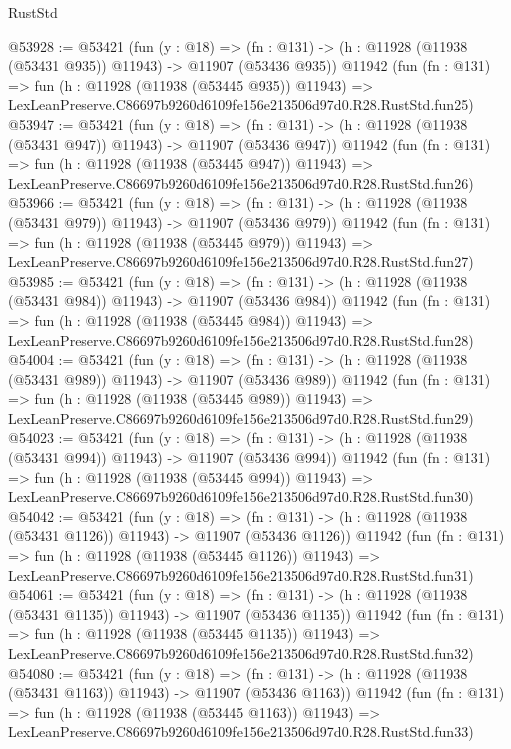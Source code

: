 \begin{lexlean}{RustStd}
\begin{coremodule}
@53928 := @53421
    (fun (y : @18) =>
    (fn : @131) -> (h : @11928 (@11938 (@53431 @935)) @11943) -> @11907 (@53436 @935))
    @11942
    (fun (fn : @131) =>
    fun (h : @11928 (@11938 (@53445 @935)) @11943) =>
    LexLeanPreserve.C86697b9260d6109fe156e213506d97d0.R28.RustStd.fun25)
@53947 := @53421
    (fun (y : @18) =>
    (fn : @131) -> (h : @11928 (@11938 (@53431 @947)) @11943) -> @11907 (@53436 @947))
    @11942
    (fun (fn : @131) =>
    fun (h : @11928 (@11938 (@53445 @947)) @11943) =>
    LexLeanPreserve.C86697b9260d6109fe156e213506d97d0.R28.RustStd.fun26)
@53966 := @53421
    (fun (y : @18) =>
    (fn : @131) -> (h : @11928 (@11938 (@53431 @979)) @11943) -> @11907 (@53436 @979))
    @11942
    (fun (fn : @131) =>
    fun (h : @11928 (@11938 (@53445 @979)) @11943) =>
    LexLeanPreserve.C86697b9260d6109fe156e213506d97d0.R28.RustStd.fun27)
@53985 := @53421
    (fun (y : @18) =>
    (fn : @131) -> (h : @11928 (@11938 (@53431 @984)) @11943) -> @11907 (@53436 @984))
    @11942
    (fun (fn : @131) =>
    fun (h : @11928 (@11938 (@53445 @984)) @11943) =>
    LexLeanPreserve.C86697b9260d6109fe156e213506d97d0.R28.RustStd.fun28)
@54004 := @53421
    (fun (y : @18) =>
    (fn : @131) -> (h : @11928 (@11938 (@53431 @989)) @11943) -> @11907 (@53436 @989))
    @11942
    (fun (fn : @131) =>
    fun (h : @11928 (@11938 (@53445 @989)) @11943) =>
    LexLeanPreserve.C86697b9260d6109fe156e213506d97d0.R28.RustStd.fun29)
@54023 := @53421
    (fun (y : @18) =>
    (fn : @131) -> (h : @11928 (@11938 (@53431 @994)) @11943) -> @11907 (@53436 @994))
    @11942
    (fun (fn : @131) =>
    fun (h : @11928 (@11938 (@53445 @994)) @11943) =>
    LexLeanPreserve.C86697b9260d6109fe156e213506d97d0.R28.RustStd.fun30)
@54042 := @53421
    (fun (y : @18) =>
    (fn : @131) -> (h : @11928 (@11938 (@53431 @1126)) @11943) -> @11907 (@53436 @1126))
    @11942
    (fun (fn : @131) =>
    fun (h : @11928 (@11938 (@53445 @1126)) @11943) =>
    LexLeanPreserve.C86697b9260d6109fe156e213506d97d0.R28.RustStd.fun31)
@54061 := @53421
    (fun (y : @18) =>
    (fn : @131) -> (h : @11928 (@11938 (@53431 @1135)) @11943) -> @11907 (@53436 @1135))
    @11942
    (fun (fn : @131) =>
    fun (h : @11928 (@11938 (@53445 @1135)) @11943) =>
    LexLeanPreserve.C86697b9260d6109fe156e213506d97d0.R28.RustStd.fun32)
@54080 := @53421
    (fun (y : @18) =>
    (fn : @131) -> (h : @11928 (@11938 (@53431 @1163)) @11943) -> @11907 (@53436 @1163))
    @11942
    (fun (fn : @131) =>
    fun (h : @11928 (@11938 (@53445 @1163)) @11943) =>
    LexLeanPreserve.C86697b9260d6109fe156e213506d97d0.R28.RustStd.fun33)

\end{coremodule}
\end{lexlean}
